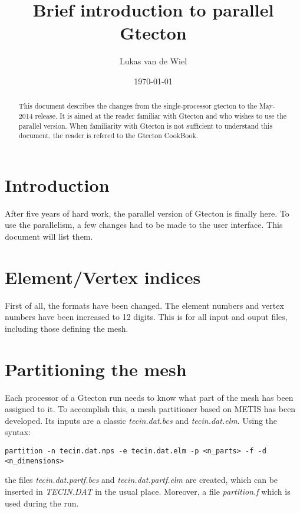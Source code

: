 \documentclass{article}
\begin{document}
\title{Brief introduction to parallel Gtecton}
\author{Lukas van de Wiel}
\date{\today}

\maketitle

\begin{abstract}
This document describes the changes from the single-processor gtecton to the May-2014 release.
It is aimed at the reader familiar with Gtecton and who wishes to use the parallel version.
When familiarity with Gtecton is not sufficient to understand this document, the reader is refered to the Gtecton CookBook.
\end{abstract}

\section{Introduction}
After five years of hard work, the parallel version of Gtecton is finally here. 
To use the parallelism, a few changes had to be made to the user interface. This document will list them.



\section{Element/Vertex indices}
First of all, the formats have been changed. The element numbers and vertex numbers have been increased to 12 digits.
This is for all input and ouput files, including those defining the mesh.


\section{Partitioning the mesh}

Each processor of a Gtecton run needs to know what part of the mesh has been assigned to it.
To accomplish this, a mesh partitioner based on METIS has been developed.
Its inputs are a classic \textit{tecin.dat.bcs} and \textit{tecin.dat.elm}.
Using the syntax:

\begin{verbatim}
partition -n tecin.dat.nps -e tecin.dat.elm -p <n_parts> -f -d <n_dimensions>
\end{verbatim}

the files \textit{tecin.dat.partf.bcs} and \textit{tecin.dat.partf.elm} are created, which can be inserted in \textit{TECIN.DAT}
in the usual place. Moreover, a file \textit{partition.f} which is used during the run.
\end{document}
